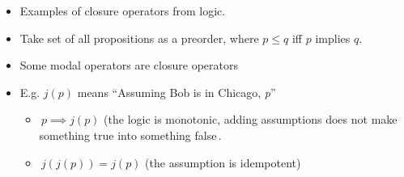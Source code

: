 \begin{itemize}
    \item Examples of closure operators from logic.
    \item Take set of all propositions as a preorder, where $p \leq q$ iff $p$ implies $q$.
    \item Some modal operators are closure operators
    \item E.g. $j(p)$ means ``Assuming Bob is in Chicago, \emph{p}''
          \begin{itemize}
            \item \,$p \implies j(p)$ (the logic is monotonic, adding assumptions does not make something true into something false\,.
            \item \,$j(j(p)) = j(p)$ (the assumption is idempotent)\,
          \end{itemize}
  \end{itemize}